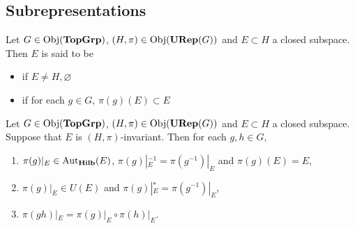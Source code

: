 \documentclass{book}
\begin{document}
	\subsection{Subrepresentations}
	
	\begin{defn}
		Let $G \in \operatorname{Obj}(\operatorname*{\text{\textbf{TopGrp}}})$, $(H, \pi) \in \operatorname{Obj}(\operatorname*{\text{\textbf{URep}}}(G))$ and $E \subset H$ a closed subspace. Then $E$ is said to be 
		\begin{itemize}
			\item {} if $E \neq H, \varnothing$
			\item {} if for each $g \in G$, $\pi(g)(E) \subset E$
		\end{itemize} 
	\end{defn}
	
	\begin{ex}
		Let $G \in \operatorname{Obj}(\operatorname*{\text{\textbf{TopGrp}}})$, $(H, \pi) \in \operatorname{Obj}(\operatorname*{\text{\textbf{URep}}}(G))$ and $E \subset H$ a closed subspace. Suppose that $E$ is $(H, \pi)$-invariant. Then for each $g,h \in G$, 
		\begin{enumerate}
			\item $\pi(g)|_E \in \operatorname{Aut}_{\operatorname*{\text{\textbf{Hilb}}}}(E)$, $\pi(g)|_E^{-1} = \pi(g^{-1})|_E$ and $\pi(g)(E) = E$,
			\item $\pi(g)|_E \in U(E)$ and $\pi(g)|_E^* = \pi(g^{-1})|_E$, 
			\item $\pi(g h)|_E = \pi(g)|_E \circ \pi(h)|_E$. 
		\end{enumerate}
	\end{ex}
	
\end{document}
